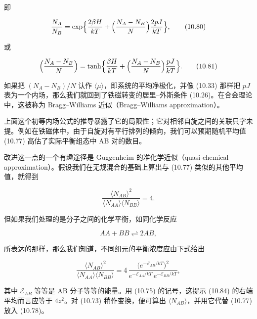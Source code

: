 即

\begin{equation*}
\frac{N_A}{N_B} = \exp \Bigl\{ \frac{2\beta H}{kT} + \Bigl( \frac{N_A - N_B}{N} \Bigr) \frac{2pJ}{kT} \Bigr\},
\tag{10.80}
\end{equation*}

或

\begin{equation*}
\Bigl( \frac{N_A - N_B}{N} \Bigr) = \tanh \Bigl\{ \frac{\beta H}{kT} + \Bigl( \frac{N_A - N_B}{N} \Bigr) \frac{pJ}{kT} \Bigr\}.
\tag{10.81}
\end{equation*}

如果把 $(N_A - N_B)/N$ 认作 $\langle \mu \rangle$，即系统的平均净极化，并像 (10.33) 那样把 $pJ$ 表为一个内场，那么我们就回到了铁磁转变的居里–外斯条件 (10.26)。在合金理论中，这被称为 Bragg--Williams 近似（Bragg--Williams approximation）。


上面这个初等内场公式的推导暴露了它的局限性；它对相邻自旋之间的关联只字未提。例如在铁磁体中，由于自旋对有平行排列的倾向，我们可以预期随机平均值 (10.77) 高估了实际平衡组态中 AB 对的数目。

改进这一点的一个有趣途径是 Guggenheim 的准化学近似（quasi-chemical approximation）。假设我们在无规混合的基础上算出与 (10.77) 类似的其他平均值，就得到

\begin{equation*}
\frac{\langle N_{AB} \rangle^2}{\langle N_{AA} \rangle \langle N_{BB} \rangle} = 4.
\tag{10.82}
\end{equation*}

但如果我们处理的是分子之间的化学平衡，如同化学反应

\begin{equation*}
AA + BB \rightleftharpoons 2AB,
\tag{10.83}
\end{equation*}

所表达的那样，那么我们知道，不同组元的平衡浓度应由下式给出

\begin{equation*}
\frac{\langle N_{AB} \rangle^2}{\langle N_{AA} \rangle \langle N_{BB} \rangle} = 4\, \frac{\bigl( e^{-\mathcal{E}_{AB}/kT} \bigr)^2}{e^{-\mathcal{E}_{AA}/kT}\, e^{-\mathcal{E}_{BB}/kT}},
\tag{10.84}
\end{equation*}

其中 $\mathcal{E}_{AB}$ 等等是 AB 分子等等的能量。用 (10.75) 的记号，这提示 (10.84) 的右端平均而言应等于 $4z^2$。对 (10.73) 稍作变换，便可算出 $\langle N_{AB} \rangle$，并用它代替 (10.77) 放入 (10.78)。

